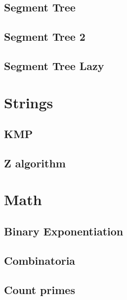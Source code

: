 \subsection{Segment Tree}
\raggedbottom
\hrulefill
\subsection{Segment Tree 2}
\raggedbottom
\hrulefill
\subsection{Segment Tree Lazy}
\raggedbottom
\hrulefill

\section{Strings}
\subsection{KMP}
\raggedbottom
\hrulefill
\subsection{Z algorithm}
\raggedbottom
\hrulefill

\section{Math}
\subsection{Binary Exponentiation}
\raggedbottom
\hrulefill
\subsection{Combinatoria}
\raggedbottom
\hrulefill
\subsection{Count primes}
\raggedbottom
\hrulefill
